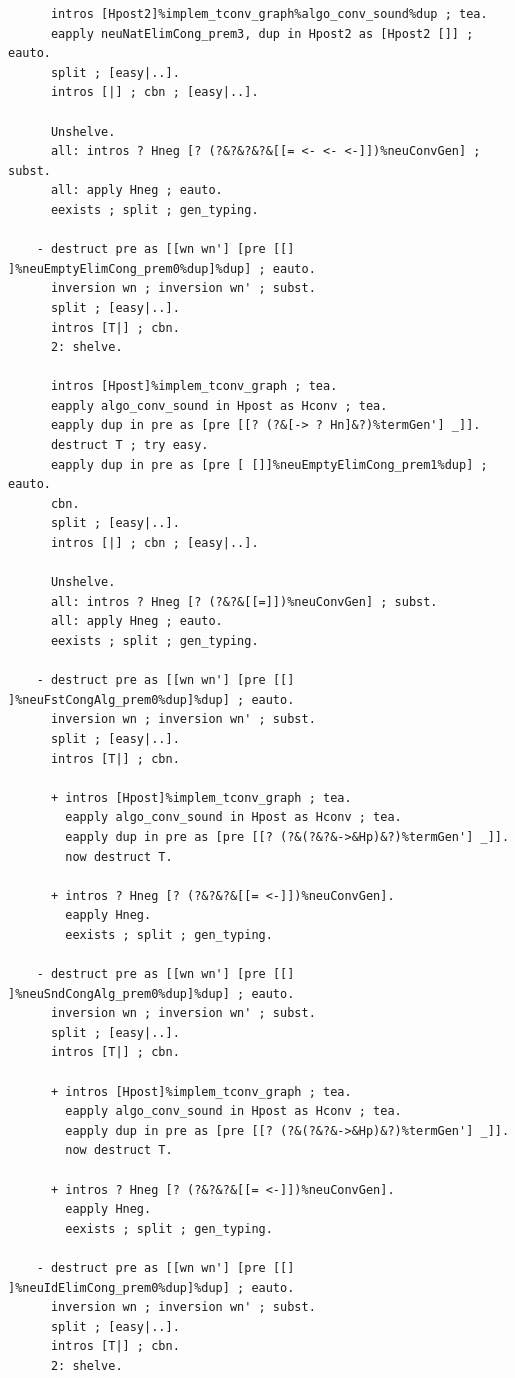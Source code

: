 \begin{lstlisting}
      intros [Hpost2]%implem_tconv_graph%algo_conv_sound%dup ; tea.
      eapply neuNatElimCong_prem3, dup in Hpost2 as [Hpost2 []] ; eauto.
      split ; [easy|..].
      intros [|] ; cbn ; [easy|..].

      Unshelve.
      all: intros ? Hneg [? (?&?&?&?&[[= <- <- <-]])%neuConvGen] ; subst.
      all: apply Hneg ; eauto.
      eexists ; split ; gen_typing.
    
    - destruct pre as [[wn wn'] [pre [[] ]%neuEmptyElimCong_prem0%dup]%dup] ; eauto.
      inversion wn ; inversion wn' ; subst.
      split ; [easy|..].
      intros [T|] ; cbn.
      2: shelve.

      intros [Hpost]%implem_tconv_graph ; tea.
      eapply algo_conv_sound in Hpost as Hconv ; tea.
      eapply dup in pre as [pre [[? (?&[-> ? Hn]&?)%termGen'] _]].
      destruct T ; try easy.
      eapply dup in pre as [pre [ []]%neuEmptyElimCong_prem1%dup] ; eauto.
      cbn.
      split ; [easy|..].
      intros [|] ; cbn ; [easy|..].

      Unshelve.
      all: intros ? Hneg [? (?&?&[[=]])%neuConvGen] ; subst.
      all: apply Hneg ; eauto.
      eexists ; split ; gen_typing.
    
    - destruct pre as [[wn wn'] [pre [[] ]%neuFstCongAlg_prem0%dup]%dup] ; eauto.
      inversion wn ; inversion wn' ; subst.
      split ; [easy|..].
      intros [T|] ; cbn.
      
      + intros [Hpost]%implem_tconv_graph ; tea.
        eapply algo_conv_sound in Hpost as Hconv ; tea.
        eapply dup in pre as [pre [[? (?&(?&?&->&Hp)&?)%termGen'] _]].
        now destruct T.

      + intros ? Hneg [? (?&?&?&[[= <-]])%neuConvGen].
        eapply Hneg.
        eexists ; split ; gen_typing.
    
    - destruct pre as [[wn wn'] [pre [[] ]%neuSndCongAlg_prem0%dup]%dup] ; eauto.
      inversion wn ; inversion wn' ; subst.
      split ; [easy|..].
      intros [T|] ; cbn.
      
      + intros [Hpost]%implem_tconv_graph ; tea.
        eapply algo_conv_sound in Hpost as Hconv ; tea.
        eapply dup in pre as [pre [[? (?&(?&?&->&Hp)&?)%termGen'] _]].
        now destruct T.

      + intros ? Hneg [? (?&?&?&[[= <-]])%neuConvGen].
        eapply Hneg.
        eexists ; split ; gen_typing.
    
    - destruct pre as [[wn wn'] [pre [[] ]%neuIdElimCong_prem0%dup]%dup] ; eauto.
      inversion wn ; inversion wn' ; subst.
      split ; [easy|..].
      intros [T|] ; cbn.
      2: shelve.


\end{lstlisting}
